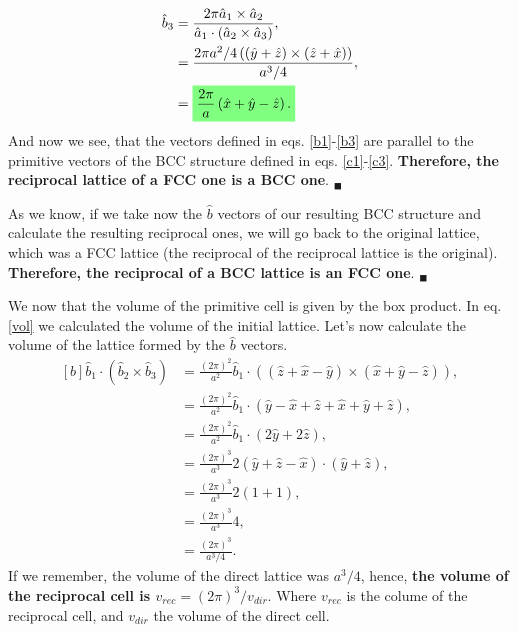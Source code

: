 \begin{questions}
\begin{solution}
  \begin{equation}
    \begin{aligned}[b]
      \hat{b}_3 &= \frac{2\pi\hat{a}_1\times\hat{a}_2}{\hat{a}_1 \cdot (\hat{a}_2\times\hat{a}_3)},\\
      &= \frac{2\pi a^2/4 \left(\left(\hat{y} + \hat{z}\right)\times\left(\hat{z} + \hat{x}\right)\right)}{a^3/4},\\
      &= \hlgreen{\frac{2\pi}{a} \left(\hat{x} + \hat{y} - \hat{z} \right).}
      \label{b3}
    \end{aligned}
  \end{equation}
  And now we see, that the vectors defined in eqs. \ref{b1}-\ref{b3} are parallel to the primitive vectors of the BCC structure defined in eqs. \ref{c1}-\ref{c3}. \textbf{Therefore, the reciprocal lattice of a FCC one is a BCC one}. $_\blacksquare$

  As we know, if we take now the $\hat{b}$ vectors of our resulting BCC structure and calculate the resulting reciprocal ones, we will go back to the original lattice, which was a FCC lattice (the reciprocal of the reciprocal lattice is the original). \textbf{Therefore, the reciprocal of a BCC lattice is an FCC one}. $_\blacksquare$
\end{solution}
\begin{solution}
  We now that the volume of the primitive cell is given by the box product. In eq. \ref{vol} we calculated the volume of the initial lattice. Let's now calculate the volume of the lattice formed by the $\hat{b}$ vectors.
  \begin{equation}
    \begin{aligned}[b]
      \hat{b}_1 \cdot (\hat{b}_2\times\hat{b}_3) &= \frac{(2\pi)^2}{a^2}\hat{b}_1 \cdot \left(\left(\hat{z} + \hat{x}- \hat{y}\right)\times\left(\hat{x} + \hat{y} - \hat{z}\right)\right),\\
      &= \frac{(2\pi)^2}{a^2}\hat{b}_1 \cdot \left(\hat{y} - \hat{x} + \hat{z} + \hat{x} + \hat{y} + \hat{z}\right),\\
      &= \frac{(2\pi)^2}{a^2}\hat{b}_1 \cdot \left(2\hat{y} + 2\hat{z}\right),\\
      &= \frac{(2\pi)^3}{a^3}2\left(\hat{y} + \hat{z} - \hat{x}\right) \cdot \left(\hat{y} + \hat{z}\right),\\
      &= \frac{(2\pi)^3}{a^3}2\left(1+1\right),\\
      &= \frac{(2\pi)^3}{a^3}4,\\
      &= \frac{(2\pi)^3}{a^3/4}.
      \label{vols}
    \end{aligned}
  \end{equation}
  If we remember, the volume of the direct lattice was $a^3/4$, hence, \textbf{the volume of the reciprocal cell is $v_{rec} = (2\pi)^3/v_{dir}$}. Where $v_{rec}$ is the colume of the reciprocal cell, and $v_{dir}$ the volume of the direct cell.
\end{solution}
\end{questions}

%
%
